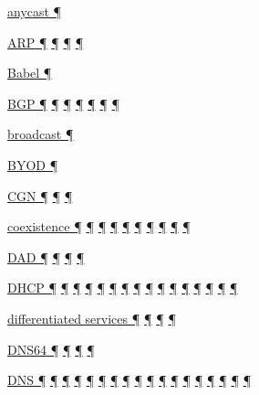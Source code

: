 \documentclass[
]{article}
\begin{document}
\hyperref[addresses]{anycast ¶}

\hyperref[address-resolution]{ARP ¶}
\hyperref[ipv6-primary-differences-from-ipv4]{¶}
\hyperref[layer-2-considerations]{¶} \hyperref[troubleshooting]{¶}

\hyperref[routing]{Babel ¶}

\hyperref[addresses]{BGP ¶} \hyperref[routing]{¶}
\hyperref[filtering]{¶} \hyperref[multi-prefix-operation]{¶}
\hyperref[multihoming]{¶} \hyperref[tools]{¶}
\hyperref[further-reading]{¶}

\hyperref[ipv6-primary-differences-from-ipv4]{broadcast ¶}

\hyperref[address-and-prefix-management]{BYOD ¶}

\hyperref[dual-stack-scenarios]{CGN ¶} \hyperref[obsolete-techniques]{¶}
\hyperref[tunnels]{¶}

\hyperref[coexistence-with-legacy-ipv4]{coexistence ¶}
\hyperref[dual-stack-scenarios]{¶} \hyperref[obsolete-techniques]{¶}
\hyperref[translation-and-ipv4-as-a-service]{¶} \hyperref[tunnels]{¶}
\hyperref[network-design]{¶} \hyperref[energy-consumption]{¶}
\hyperref[multihoming]{¶} \hyperref[security-operation]{¶}
\hyperref[obsolete-features-in-ipv6]{¶}

\hyperref[address-resolution]{DAD ¶} \hyperref[auto-configuration]{¶}
\hyperref[layer-2-considerations]{¶}
\hyperref[address-and-prefix-management]{¶}

\hyperref[auto-configuration]{DHCP ¶} \hyperref[dns]{¶}
\hyperref[managed-configuration]{¶} \hyperref[routing]{¶}
\hyperref[source-and-destination-address-selection]{¶}
\hyperref[dual-stack-scenarios]{¶}
\hyperref[ipv6-primary-differences-from-ipv4]{¶} \hyperref[filtering]{¶}
\hyperref[layer-2-considerations]{¶} \hyperref[address-planning]{¶}
\hyperref[prefix-per-host]{¶}
\hyperref[address-and-prefix-management]{¶}
\hyperref[multi-prefix-operation]{¶} \hyperref[cern-and-the-lhc]{¶}
\hyperref[troubleshooting]{¶} \hyperref[advanced-troubleshooting]{¶}

\hyperref[packet-format]{differentiated services ¶}
\hyperref[routing]{¶} \hyperref[traffic-class-and-flow-label]{¶}
\hyperref[transport-protocols]{¶}

\hyperref[dual-stack-scenarios]{DNS64 ¶}
\hyperref[translation-and-ipv4-as-a-service]{¶}
\hyperref[advanced-troubleshooting]{¶} \hyperref[tools]{¶}

\hyperref[how-an-application-programmer-sees-ipv6]{DNS ¶}
\hyperref[addresses]{¶} \hyperref[auto-configuration]{¶}
\hyperref[dns]{¶} \hyperref[managed-configuration]{¶}
\hyperref[dual-stack-scenarios]{¶}
\hyperref[translation-and-ipv4-as-a-service]{¶}
\hyperref[management-and-operations]{¶}
\hyperref[address-and-prefix-management]{¶}
\hyperref[benchmarking-and-monitoring]{¶}
\hyperref[multi-prefix-operation]{¶} \hyperref[multihoming]{¶}
\hyperref[deployment-in-the-enterprise]{¶}
\hyperref[deployment-in-the-home]{¶} \hyperref[status]{¶}
\hyperref[troubleshooting]{¶} \hyperref[advanced-troubleshooting]{¶}
\hyperref[tools]{¶}
\end{document}
